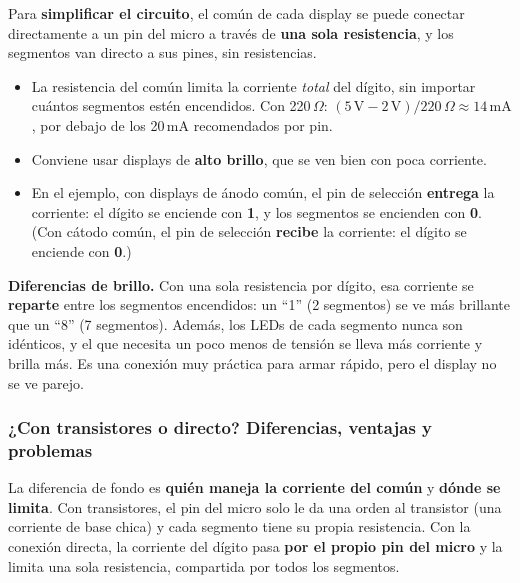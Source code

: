 Para \textbf{simplificar el circuito}, el común de cada display se puede conectar
directamente a un pin del micro a través de \textbf{una sola resistencia}, y los
segmentos van directo a sus pines, sin resistencias.

\begin{itemize}
  \item La resistencia del común limita la corriente \emph{total} del dígito, sin
        importar cuántos segmentos estén encendidos. Con 220\,$\Omega$:
        $(5\,\text{V} - 2\,\text{V}) / 220\,\Omega \approx 14\,\text{mA}$, por
        debajo de los 20\,mA recomendados por pin.
  \item Conviene usar displays de \textbf{alto brillo}, que se ven bien con poca
        corriente.
  \item En el ejemplo, con displays de ánodo común, el pin de selección
        \textbf{entrega} la corriente: el dígito se enciende con \textbf{1}, y los
        segmentos se encienden con \textbf{0}. (Con cátodo común, el pin de selección
        \textbf{recibe} la corriente: el dígito se enciende con \textbf{0}.)
\end{itemize}


\begin{advertenciabox}
\textbf{Diferencias de brillo.} Con una sola resistencia por dígito, esa corriente se
\textbf{reparte} entre los segmentos encendidos: un ``1'' (2 segmentos) se ve más
brillante que un ``8'' (7 segmentos). Además, los LEDs de cada segmento nunca son
idénticos, y el que necesita un poco menos de tensión se lleva más corriente y brilla
más. Es una conexión muy práctica para armar rápido, pero el display no se ve parejo.
\end{advertenciabox}

\subsubsection{¿Con transistores o directo? Diferencias, ventajas y problemas}

La diferencia de fondo es \textbf{quién maneja la corriente del común} y
\textbf{dónde se limita}. Con transistores, el pin del micro solo le da una orden al
transistor (una corriente de base chica) y cada segmento tiene su propia resistencia.
Con la conexión directa, la corriente del dígito pasa \textbf{por el propio pin del
micro} y la limita una sola resistencia, compartida por todos los segmentos.


